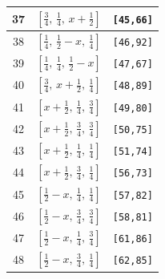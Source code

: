 \documentclass[fleqn,8pt]{jsarticle}
\begin{document}
\begin{longtable}{ccc}
37 & $\left[ \frac{3}{4},\, \frac{1}{4},\, x + \frac{1}{2} \right]$ & {\tt [45,66]} \\ \hline
38 & $\left[ \frac{1}{4},\, \frac{1}{2} - x,\, \frac{1}{4} \right]$ & {\tt [46,92]} \\ \hline
39 & $\left[ \frac{1}{4},\, \frac{1}{4},\, \frac{1}{2} - x \right]$ & {\tt [47,67]} \\ \hline
40 & $\left[ \frac{3}{4},\, x + \frac{1}{2},\, \frac{1}{4} \right]$ & {\tt [48,89]} \\ \hline
41 & $\left[ x + \frac{1}{2},\, \frac{1}{4},\, \frac{3}{4} \right]$ & {\tt [49,80]} \\ \hline
42 & $\left[ x + \frac{1}{2},\, \frac{3}{4},\, \frac{3}{4} \right]$ & {\tt [50,75]} \\ \hline
43 & $\left[ x + \frac{1}{2},\, \frac{1}{4},\, \frac{1}{4} \right]$ & {\tt [51,74]} \\ \hline
44 & $\left[ x + \frac{1}{2},\, \frac{3}{4},\, \frac{1}{4} \right]$ & {\tt [56,73]} \\ \hline
45 & $\left[ \frac{1}{2} - x,\, \frac{1}{4},\, \frac{1}{4} \right]$ & {\tt [57,82]} \\ \hline
46 & $\left[ \frac{1}{2} - x,\, \frac{3}{4},\, \frac{3}{4} \right]$ & {\tt [58,81]} \\ \hline
47 & $\left[ \frac{1}{2} - x,\, \frac{1}{4},\, \frac{3}{4} \right]$ & {\tt [61,86]} \\ \hline
48 & $\left[ \frac{1}{2} - x,\, \frac{3}{4},\, \frac{1}{4} \right]$ & {\tt [62,85]} \\
\end{longtable}
\renewcommand{\arraystretch}{1.2}
\end{document}
